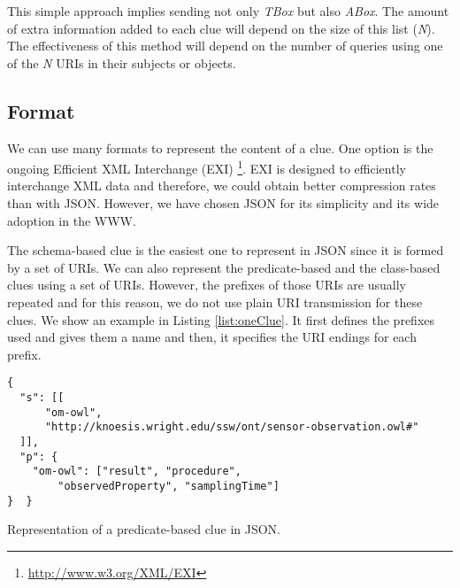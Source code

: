 This simple approach implies sending not only \emph{TBox} but also \emph{ABox}.
The amount of extra information added to each clue will depend on the size of this list (\emph{N}).
The effectiveness of this method will depend on the number of queries using one of the \emph{N} URIs in their subjects or objects.


\subsection{Format}
We can use many formats to represent the content of a clue.
One option is the ongoing Efficient XML Interchange (EXI) \footnote{\url{http://www.w3.org/XML/EXI}}. %
EXI is designed to efficiently interchange XML data and therefore, we could obtain better compression rates than with JSON. %
However, we have chosen JSON for its simplicity and its wide adoption in the WWW.

The schema-based clue is the easiest one to represent in JSON since it is formed by a set of URIs.
We can also represent the predicate-based and the class-based clues using a set of URIs.
However, the prefixes of those URIs are usually repeated and for this reason, we do not use plain URI transmission for these clues.
We show an example in Listing \ref{list:oneClue}.
It first defines the prefixes used and gives them a name and then, it specifies the URI endings for each prefix.

\begin{listing}
\begin{verbatim}
{
  "s": [[
      "om-owl",
      "http://knoesis.wright.edu/ssw/ont/sensor-observation.owl#"
  ]],
  "p": {
    "om-owl": ["result", "procedure",
		"observedProperty", "samplingTime"]
}  }
\end{verbatim}
\caption{Representation of a predicate-based clue in JSON.}
\label{list:oneClue}
\end{listing}

\medskip

